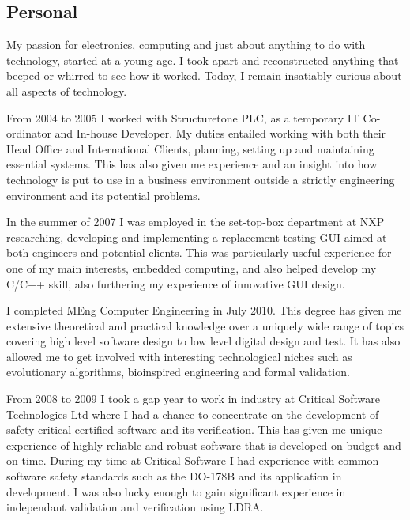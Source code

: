 \documentclass[overlapped,line,letterpaper]{res}
\begin{document}
\begin{resume}
\newpage

\section{\bf{ Personal } }
My passion for electronics, computing and just about anything to do with
technology, started at a young age.
I took apart and reconstructed anything that beeped or whirred to see how it
worked.
Today, I remain insatiably curious about all aspects of technology.

From 2004 to 2005 I worked with Structuretone PLC, as a temporary IT
Co-ordinator and In-house Developer.
My duties entailed working with both their Head Office and International Clients,
planning, setting up and maintaining essential systems.
This has also given me experience and an insight into how technology is put to
use in a business environment outside a strictly engineering environment and its
potential problems.

In the summer of 2007 I was employed in the set-top-box department at NXP
researching, developing and implementing a replacement testing GUI aimed at both
engineers and potential clients.
This was particularly useful experience for one of my main interests, embedded
computing, and also helped develop my C/C++ skill, also furthering my experience
of innovative GUI design.

I completed MEng Computer Engineering in July 2010.
This degree has given me extensive theoretical and practical knowledge over a
uniquely wide range of topics covering high level software design to low level
digital design and test.
It has also allowed me to get involved with interesting technological niches
such as evolutionary algorithms, bioinspired engineering and formal validation.

From 2008 to 2009 I took a gap year to work in industry at Critical Software
Technologies Ltd where I had a chance to concentrate on the development of
safety critical certified software and its verification.
This has given me unique experience of highly reliable and robust software that
is developed on-budget and on-time.
During my time at Critical Software I had experience with common software
safety standards such as the DO-178B and its application in development.
I was also lucky enough to gain significant experience in independant validation
and verification using LDRA.


\end{resume}
\end{document}
